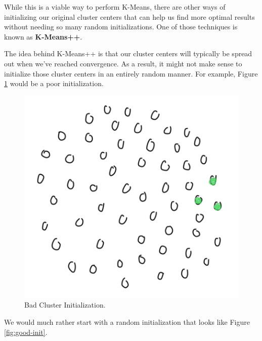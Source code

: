 While this is a viable way to perform K-Means, there are other ways of initializing our original cluster centers that can help us find more optimal results without needing so many random initializations. One of those techniques is known as \textbf{K-Means++}.

The idea behind K-Means++ is that our cluster centers will typically be spread out when we've reached convergence. As a result, it might not make sense to initialize those cluster centers in an entirely random manner. For example, Figure \ref{fig:bad-init} would be a poor initialization.

\begin{figure}
    \centering
    \includegraphics[width=0.5\paperwidth]{../Clustering/fig/bad-initialization.png}
    \caption{Bad Cluster Initialization.}
    \label{fig:bad-init}
\end{figure}

We would much rather start with a random initialization that looks like Figure \ref{fig:good-init}.

